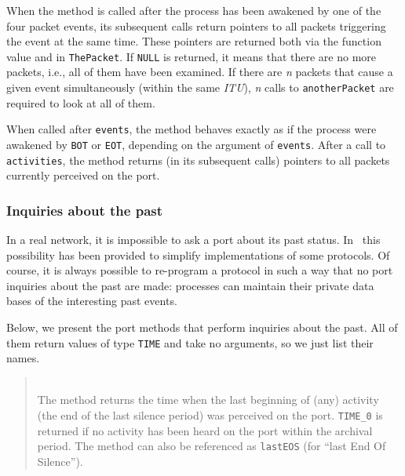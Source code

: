 When the method is called after the process has been awakened by one of the
four packet events,
its subsequent calls return pointers to all packets
triggering the event at the same time.
These pointers are returned both via the function
value and in {\tt ThePacket}.
If {\tt NULL} is returned, it
means that there are no more packets, i.e.,
all of them have been examined.
If there are {\em n\/} packets that cause a given event simultaneously
(within the same {\em ITU\/}), {\em n\/} calls
to {\tt anotherPacket} are required to look at all of them.

When called after {\tt events}, the method behaves exactly as if
the process were awakened by {\tt BOT} or {\tt EOT}, depending on the
argument of {\tt events}.
After a call to
{\tt activities}, the method returns (in its subsequent calls)
pointers to all packets currently perceived on the port.

\subsubsection{Inquiries about the past}
\label{rm_po_in_pa}

In a real network, it is impossible to ask a port about its past status.
In \smurph\ this possibility has been provided to simplify implementations
of some protocols.
Of course, it is always possible to re-program a protocol in such a way
that no port inquiries about the past are made: processes can maintain their
private data bases of the interesting past events.

Below, we present the port methods that perform inquiries about the past.
All of them return values of type {\tt TIME} and take no arguments, so we
just list their names.


\medskip

\begin{quote}
\noindent{}\\ \hspace{0in}
The method returns the time when the last beginning of (any) activity
(the end of the last silence period) was perceived on the
port.
{\tt TIME\_0} is returned
if no activity has been heard on the port within the archival period.
The method can also be referenced as {\tt lastEOS} (for ``last End Of
Silence'').
\end{quote}

